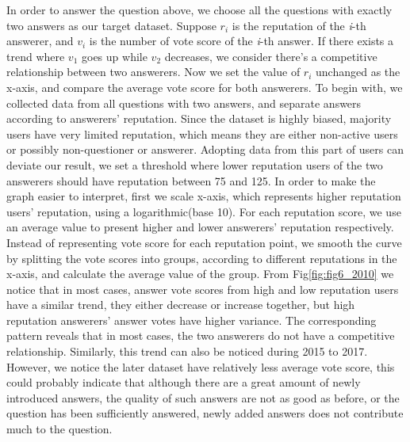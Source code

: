 In order to answer the question above, we choose all the questions with exactly two answers as our target dataset. Suppose $r_{i}$ is the reputation of the \textit{i}-th answerer, and $v_{i}$ is the number of vote score of the \textit{i}-th answer. If there exists a trend where $v_{1}$ goes up while $v_{2}$ decreases, we consider there's a competitive relationship between two answerers. Now we set the value of $r_{i}$ unchanged as the x-axis, and compare the average vote score for both answerers. To begin with, we collected data from all questions with two answers, and separate answers according to answerers' reputation. Since the dataset is highly biased, majority users have very limited reputation, which means they are either non-active users or possibly non-questioner or answerer. Adopting data from this part of users can deviate our result, we set a threshold where lower reputation users of the two answerers should have reputation between 75 and 125. In order to make the graph easier to interpret, first we scale x-axis, which represents higher reputation users' reputation, using a logarithmic(base 10). For each reputation score, we use an average value to present higher and lower answerers' reputation respectively. Instead of representing vote score for each reputation point, we smooth the curve by splitting the vote scores into groups, according to different reputations in the x-axis, and calculate the average value of the group. From Fig\ref{fig:fig6_2010} we notice that in most cases, answer vote scores from high and low reputation users have a similar trend, they either decrease or increase together, but high reputation answerers' answer votes have higher variance. The corresponding pattern reveals that in most cases, the two answerers do not have a competitive relationship. Similarly, this trend can also be noticed during 2015 to 2017. However, we notice the later dataset have relatively less average vote score, this could probably indicate that although there are a great amount of newly introduced answers, the quality of such answers are not as good as before, or the question has been sufficiently answered, newly added answers does not contribute much to the question. 


